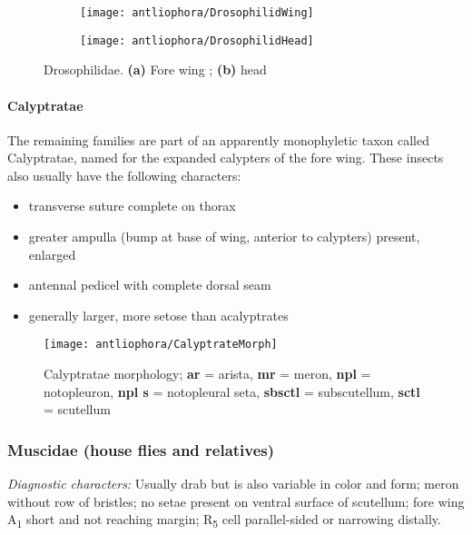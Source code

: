 \begin{figure}[ht!]
    \centering
    \begin{subfigure}[ht!]{0.5\textwidth}
        \texttt{[image: antliophora/DrosophilidWing]}
        \caption{}
        \label{fig:drosophilid1}
    \end{subfigure}
    \qquad
    \begin{subfigure}[ht!]{0.27\textwidth}
        \texttt{[image: antliophora/DrosophilidHead]}
        \caption{}
        \label{fig:drosophilid2}
    \end{subfigure}
    \caption{Drosophilidae. \textbf{(a)} Fore wing \citep[][Fig. 95.6]{mcalpine1981manualv2}; \textbf{(b)} head \citep[][Fig. 95.6]{mcalpine1981manualv2}}\label{fig:drosophilids}
\end{figure}

\paragraph{Calyptratae} The remaining families are part of an apparently monophyletic taxon called Calyptratae, named for the expanded calypters of the fore wing. These insects also usually have the following characters:
\begin{itemize}
\item transverse suture complete on thorax
\item greater ampulla (bump at base of wing, anterior to calypters) present, enlarged 
\item antennal pedicel with complete dorsal seam
\item generally larger, more setose than acalyptrates
\end{itemize}

\begin{figure}[ht!]
  \centering
    \texttt{[image: antliophora/CalyptrateMorph]}
  \caption{Calyptratae morphology; \textbf{ar} = arista, \textbf{mr} = meron, \textbf{npl} = notopleuron, \textbf{npl s} = notopleural seta, \textbf{sbsctl} = subscutellum, \textbf{sctl} = scutellum \citep[][Fig. 2.66]{mcalpine1981manual}}
  \label{fig:calyptratemorph}
\end{figure}

\subsubsection{Muscidae (house flies and relatives)}
\noindent{}\textit{Diagnostic characters:} Usually drab but is also variable in color and form; meron without row of bristles; no setae present on ventral surface of scutellum; fore wing \texorpdfstring{A\textsubscript{1}}{A1} short and not reaching margin; \texorpdfstring{R\textsubscript{5}}{R5} cell parallel-sided or narrowing distally.\vspace{3mm}

